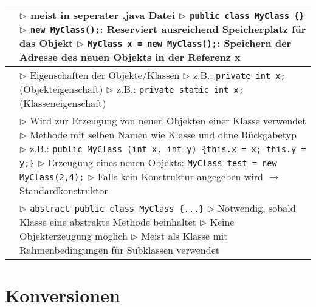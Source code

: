 	\begin{tabular}{ | p{4cm} p{13.5cm} | }
	\hline
	\makecell[l]{Erzeugung} & \makecell[l]{$\rhd$ meist in seperater .java Datei  \\
	$\rhd$ \texttt{public class MyClass \{\}} \\
	$\rhd$ \texttt{new MyClass();}: \\
	\hspace{0.8cm} Reserviert ausreichend Speicherplatz für das Objekt \\ 
	$\rhd$ \texttt{MyClass x = new MyClass();}: \\
	\hspace{0.8cm} Speichern der Adresse des neuen Objekts in der Referenz x } \\ \hline
	
	\makecell[l]{Attribute} & \makecell[l]{$\rhd$ Eigenschaften der Objekte/Klassen \\
	$\rhd$ z.B.: \texttt{private int x;} (Objekteigenschaft) \\
	$\rhd$ z.B.: \texttt{private static int x;} (Klasseneigenschaft)  } \\ \hline
	
	\makecell[l]{Konstruktor} & 
	\makecell[l]{$\rhd$ Wird zur Erzeugung von neuen Objekten einer Klasse verwendet \\
	$\rhd$ Methode mit selben Namen wie Klasse und ohne Rückgabetyp \\
	$\rhd$ z.B.: \texttt{public MyClass (int x, int y) \{this.x = x; this.y = y;\}} \\
	$\rhd$ Erzeugung eines neuen Objekts: \texttt{MyClass test = new MyClass(2,4);} \\
	$\rhd$ Falls kein Konstruktur angegeben wird $\rightarrow$ Standardkonstruktor } \\ \hline

	\makecell[l]{Abstraktion} & \makecell[l]{$\rhd$ \texttt{abstract public class MyClass \{...\}} \\
	$\rhd$ Notwendig, sobald Klasse eine abstrakte Methode beinhaltet \\
	$\rhd$ Keine Objekterzeugung möglich \\
	$\rhd$ Meist als Klasse mit Rahmenbedingungen für Subklassen verwendet }  \\ \hline
	
	\end{tabular}

\section{Konversionen}

